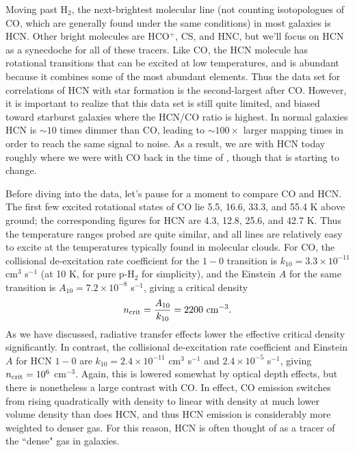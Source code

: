 Moving past H$_2$, the next-brightest molecular line (not counting isotopologues of CO, which are generally found under the same conditions) in most galaxies is HCN. Other bright molecules are HCO$^+$, CS, and HNC, but we'll focus on HCN as a synecdoche for all of these tracers. Like CO, the HCN molecule has rotational transitions that can be excited at low temperatures, and is abundant because it combines some of the most abundant elements. Thus the data set for correlations of HCN with star formation is the second-largest after CO. However, it is important to realize that this data set is still quite limited, and biased toward starburst galaxies where the HCN/CO ratio is highest. In normal galaxies HCN is $\sim 10$ times dimmer than CO, leading to $\sim 100\times$ larger mapping times in order to reach the same signal to noise. As a result, we are with HCN today roughly where we were with CO back in the time of \citet{kennicutt98a}, though that is starting to change.

Before diving into the data, let's pause for a moment to compare CO and HCN. The first few excited rotational states of CO lie 5.5, 16.6, 33.3, and 55.4 K above ground; the corresponding figures for HCN are 4.3, 12.8, 25.6, and 42.7 K. Thus the temperature ranges probed are quite similar, and all lines are relatively easy to excite at the temperatures typically found in molecular clouds. For CO, the collisional de-excitation rate coefficient for the $1-0$ transition is $k_{10} = 3.3\times 10^{-11}$ cm$^3$ s$^{-1}$ (at 10 K, for pure p-H$_2$ for simplicity), and the Einstein $A$ for the same transition is $A_{10} = 7.2\times 10^{-8}$ s$^{-1}$, giving a critical density
\begin{equation}
n_{\rm crit} = \frac{A_{10}}{k_{10}} = 2200\mbox{ cm}^{-3}.
\end{equation}
As we have discussed, radiative transfer effects lower the effective critical density significantly. In contrast, the collisional de-excitation rate coefficient and Einstein $A$ for HCN $1-0$ are $k_{10} = 2.4\times 10^{-11}$ cm$^3$ s$^{-1}$ and $2.4\times 10^{-5}$ s$^{-1}$, giving $n_{\rm crit} = 10^6$ cm$^{-3}$. Again, this is lowered somewhat by optical depth effects, but there is nonetheless a large contrast with CO. In effect, CO emission switches from rising quadratically with density to linear with density at much lower volume density than does HCN, and thus HCN emission is considerably more weighted to denser gas. For this reason, HCN is often thought of as a tracer of the ``dense" gas in galaxies.

